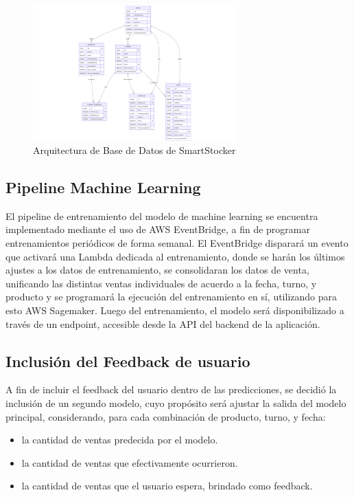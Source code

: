 \begin{figure}[htbp]
    \centering
    \includegraphics[width=0.7\textwidth]{images/arquitectura-base-datos.png}
    \caption{Arquitectura de Base de Datos de SmartStocker}
    \label{fig:arquitectura-base-datos}
\end{figure}

\subsection{Pipeline Machine Learning}\label{sec:pipeline-machine-learning}

El pipeline de entrenamiento del modelo de machine learning se encuentra implementado mediante el uso de AWS EventBridge, a fin de programar entrenamientos periódicos de forma semanal. El EventBridge disparará un evento que activará una Lambda dedicada al entrenamiento, donde se harán los últimos ajustes a los datos de entrenamiento, se consolidaran los datos de venta, unificando las distintas ventas individuales de acuerdo a la fecha, turno, y producto y se programará la ejecución del entrenamiento en sí, utilizando para esto AWS Sagemaker. Luego del entrenamiento, el modelo será disponibilizado a través de un endpoint, accesible desde la API del backend de la aplicación.

\subsection{Inclusión del Feedback de usuario}\label{sec:inclusion-feedback-usuario}

A fin de incluir el feedback del usuario dentro de las predicciones, se decidió la inclusión de un segundo modelo, cuyo propósito será ajustar la salida del modelo principal, considerando, para cada combinación de producto, turno, y fecha: 

\begin{itemize}
    \item la cantidad de ventas predecida por el modelo.
    \item la cantidad de ventas que efectivamente ocurrieron.
    \item la cantidad de ventas que el usuario espera, brindado como feedback.
\end{itemize}

